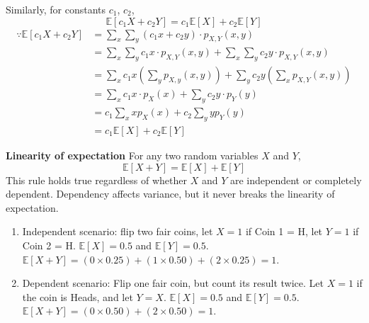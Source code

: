 \documentclass[../Probability.tex]{subfiles}
\begin{document}
\noindent Similarly, for constants $c_1$, $c_2$, \\[5pt]
\[\mathbb{E}[c_1X+c_2Y] = c_1\mathbb{E}[X] + c_2\mathbb{E}[Y]\]
\begin{align*}
    \because \mathbb{E}[c_1X+c_2Y] &= \sum_x\sum_y(c_1x + c_2y)\cdot p_{X,Y}(x,y) \\
    &= \sum_x\sum_yc_1x\cdot p_{X,Y}(x,y) + \sum_x\sum_yc_2y\cdot p_{X,Y}(x,y) \\
    &= \sum_xc_1x(\sum_yp_{X,y}(x,y)) + \sum_yc_2y(\sum_xp_{X,Y}(x,y)) \\
    &= \sum_xc_1x\cdot p_X(x) + \sum_yc_2y\cdot p_Y(y) \\
    &= c_1\sum_xxp_X(x) + c_2\sum_yyp_Y(y) \\ 
    &= c_1\mathbb{E}[X] + c_2\mathbb{E}[Y]
\end{align*}

\noindent\textbf{Linearity of expectation}
For any two random variables $X$ and $Y$,
$$\mathbb{E}[X+Y] = \mathbb{E}[X] + \mathbb{E}[Y]$$
This rule holds true regardless of whether $X$ and $Y$ are independent or completely dependent. Dependency affects variance, but it never breaks the linearity of expectation.
\begin{enumerate}
    \item Independent scenario: flip two fair coins, let $X=1$ if Coin 1 = H, let $Y=1$ if Coin 2 = H.\newline
    $\mathbb{E}[X] = 0.5$ and $\mathbb{E}[Y] = 0.5$.\newline
    $\mathbb{E}[X+Y] = (0 \times 0.25) + (1 \times 0.50) + (2 \times 0.25) = 1$.
    \item Dependent scenario: Flip one fair coin, but count its result twice. Let $X = 1$ if the coin is Heads, and let $Y = X$.\newline
    $\mathbb{E}[X] = 0.5$ and $\mathbb{E}[Y] = 0.5$.\newline
    $\mathbb{E}[X+Y] = (0 \times 0.50) + (2 \times 0.50) = 1$.
\end{enumerate}
\end{document}
